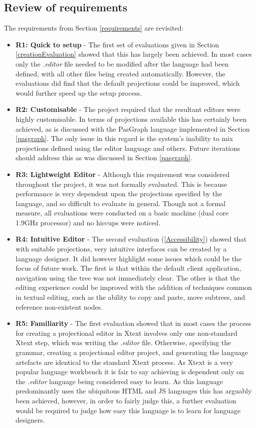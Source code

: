\documentclass{article}
\begin{document}
{\subsection{Review of requirements}
The requirements from Section \ref{requirements} are revisited:
\begin{itemize}
\item \textbf{R1: Quick to setup} - The first set of evaluations given in Section \ref{creationEvaluation} showed that this has largely been achieved. In most cases only the \emph{.editor} file needed to be modified after the language had been defined, with all other files being created automatically. However, the evaluations did find that the default projections could be improved, which would further speed up the setup process.
\item \textbf{R2: Customisable} - The project required that the resultant editors were highly customisable. In terms of projections available this has certainly been achieved, as is discussed with the PasGraph language implemented in Section \ref{pasgraph}. The only issue in this regard is the system's inability to mix projections defined using the editor language and others. Future iterations should address this as was discussed in Section \ref{pasgraph}.  
\item \textbf{R3: Lightweight Editor} - Although this requirement was considered throughout the project, it was not formally evaluated. This is because performance is very dependent upon the projections specified by the language, and so difficult to evaluate in general. Though not a formal measure, all evaluations were conducted on a basic machine (dual core 1.9GHz processor) and no hiccups were noticed. 
\item \textbf{R4: Intuitive Editor} - The second evaluation (\ref{Accessibility}) showed that with suitable projections, very intuitive interfaces can be created by a language designer. It did however highlight some issues which could be the focus of future work. The first is that within the default client application, navigation using the tree was not immediately clear. The other is that the editing experience could be improved with the addition of techniques common in textual editing, such as the ability to copy and paste, move subtrees, and reference non-existent nodes.
\item \textbf{R5: Familiarity} - The first evaluation showed that in most cases the process for creating a projectional editor in Xtext involves only one non-standard Xtext step, which was writing the \emph{.editor} file. Otherwise, specifying the grammar, creating a projectional editor project, and generating the language artefacts are identical to the standard Xtext process. As Xtext is a very popular language workbench it is fair to say achieving \RFamiliarity is dependent only on the \emph{.editor} language being considered easy to learn. As this language predominantly uses the ubiquitous HTML and JS languages this has arguably been achieved, however, in order to fairly judge this, a further evaluation would be required to judge how easy this language is to learn for language designers.
\end{itemize}

}
\end{document}
